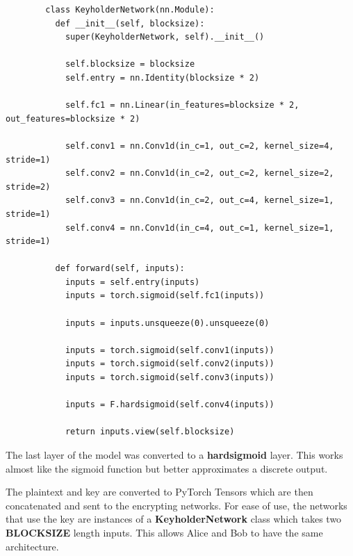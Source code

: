 \documentclass[a4paper]{article}
\begin{document}
      \begin{lstlisting}
        class KeyholderNetwork(nn.Module):
          def __init__(self, blocksize):
            super(KeyholderNetwork, self).__init__()
            
            self.blocksize = blocksize
            self.entry = nn.Identity(blocksize * 2)

            self.fc1 = nn.Linear(in_features=blocksize * 2, out_features=blocksize * 2)
            
            self.conv1 = nn.Conv1d(in_c=1, out_c=2, kernel_size=4, stride=1)
            self.conv2 = nn.Conv1d(in_c=2, out_c=2, kernel_size=2, stride=2)
            self.conv3 = nn.Conv1d(in_c=2, out_c=4, kernel_size=1, stride=1)
            self.conv4 = nn.Conv1d(in_c=4, out_c=1, kernel_size=1, stride=1)

          def forward(self, inputs):    
            inputs = self.entry(inputs)
            inputs = torch.sigmoid(self.fc1(inputs))

            inputs = inputs.unsqueeze(0).unsqueeze(0)

            inputs = torch.sigmoid(self.conv1(inputs))
            inputs = torch.sigmoid(self.conv2(inputs))
            inputs = torch.sigmoid(self.conv3(inputs))
            
            inputs = F.hardsigmoid(self.conv4(inputs))

            return inputs.view(self.blocksize)
      \end{lstlisting}

      The last layer of the model was converted to a {\bfseries hardsigmoid} layer. This works
      almost like the sigmoid function but better approximates a discrete output.

      The plaintext and key are converted to PyTorch Tensors which are then concatenated and sent
      to the encrypting networks. For ease of use, the networks that use the key are instances of a 
      {\bfseries KeyholderNetwork} class which takes two {\bfseries BLOCKSIZE} length inputs.
      This allows Alice and Bob to have the same architecture.
\end{document}
